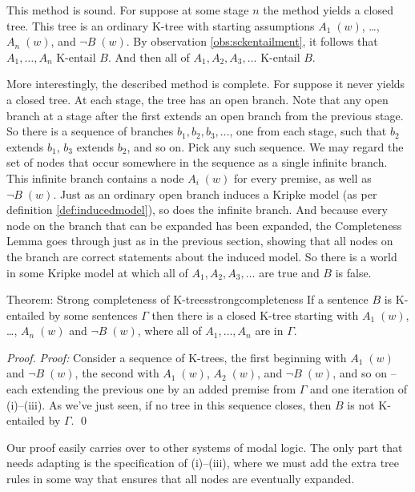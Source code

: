 This method is sound. For suppose at some stage $n$ the method yields a closed
tree. This tree is an ordinary K-tree with starting assumptions $A_{1}\; (w)$,
\ldots, $A_{n}\; (w)$, and $\neg B\; (w)$. By observation
\ref{obs:sckentailment}, it follows that $A_{1},\ldots,A_{n}$ K-entail $B$. And
then all of $A_{1},A_{2},A_{3},\ldots$ K-entail $B$.

More interestingly, the described method is complete. For suppose it never
yields a closed tree. At each stage, the tree has an open branch. Note that any
open branch at a stage after the first extends an open branch from the previous
stage. So there is a sequence of branches $b_{1}, b_{2}, b_{3}, \ldots$, one
from each stage, such that $b_{2}$ extends $b_{1}$, $b_{3}$ extends $b_{2}$, and
so on. Pick any such sequence. We may regard the set of nodes that occur
somewhere in the sequence as a single infinite branch. This infinite branch
contains a node $A_{i}\; (w)$ for every premise, as well as $\neg B\; (w)$. Just
as an ordinary open branch induces a Kripke model (as per definition
\ref{def:inducedmodel}), so does the infinite branch. And because every node on
the branch that can be expanded has been expanded, the Completeness Lemma goes
through just as in the previous section, showing that all nodes on the branch
are correct statements about the induced model. So there is a world in some
Kripke model at which all of $A_{1},A_{2},A_{3},\ldots$ are true and $B$ is
false.

\begin{theorem}{Theorem: Strong completeness of K-trees}{strongcompleteness}
  If a sentence $B$ is K-entailed by some sentences $\Gamma$ then there is a
  closed K-tree starting with $A_{1}\; (w)$, \ldots, $A_{n}\; (w)$ and
  $\neg B\; (w)$, where all of $A_{1},\ldots,A_{n}$ are in $\Gamma$.
\end{theorem}
\begin{proof}
  \emph{Proof:} Consider a sequence of K-trees, the first beginning with
  $A_{1}\; (w)$ and $\neg B\; (w)$, the second with $A_{1}\; (w)$,
  $A_{2}\; (w)$, and $\neg B\; (w)$, and so on -- each extending the previous
  one by an added premise from $\Gamma$ and one iteration of (i)--(iii). As
  we've just seen, if no tree in this sequence closes, then $B$ is not K-entailed
  by $\Gamma$. \qed
\end{proof}
%
Our proof easily carries over to other systems of modal logic. The only part
that needs adapting is the specification of (i)--(iii), where we must add the
extra tree rules in some way that ensures that all nodes are eventually
expanded.

